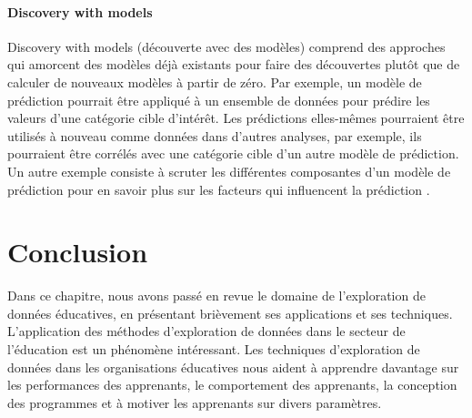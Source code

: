 \paragraph{Discovery with models \\}
Discovery with models (découverte avec des modèles) comprend des approches qui amorcent des modèles déjà existants pour faire des découvertes plutôt que de calculer de nouveaux modèles à partir de zéro. Par exemple, un modèle de prédiction pourrait être appliqué à un ensemble de données pour prédire les valeurs d'une catégorie cible d'intérêt. Les prédictions elles-mêmes pourraient être utilisés à nouveau comme données dans d'autres analyses, par exemple, ils pourraient être corrélés avec une catégorie cible d’un autre modèle de prédiction. Un autre exemple consiste à scruter les différentes composantes d'un modèle de prédiction pour en savoir plus sur les facteurs qui influencent la prédiction \cite{Scheuer2012}.

\section{Conclusion}
Dans ce chapitre, nous avons passé en revue le domaine de l'exploration de données éducatives, en présentant brièvement ses applications et ses techniques. L'application des méthodes d'exploration de données dans le secteur de l'éducation est un phénomène intéressant. Les techniques d'exploration de données dans les organisations éducatives nous aident à apprendre davantage sur les performances des apprenants, le comportement des apprenants, la conception des programmes et à motiver les apprenants sur divers paramètres.
	
	